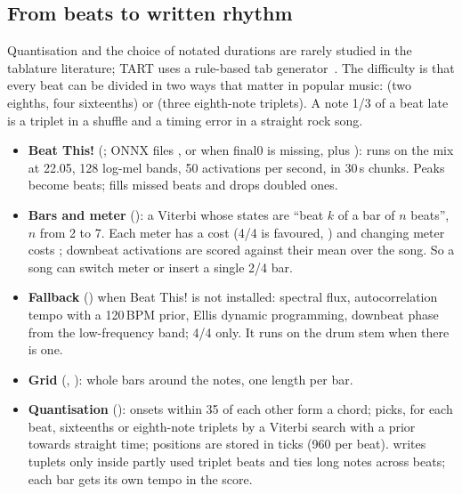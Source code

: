 \subsection{From beats to written rhythm}

Quantisation and the choice of notated durations are rarely studied in the
tablature literature; TART uses a rule-based tab generator~\cite{gupta2026tart}.
The difficulty is that every beat can be divided in two ways that matter in
popular music:  (two eighths, four sixteenths) or
 (three eighth-note triplets). A note 1/3 of a beat late is a
triplet in a shuffle and a timing error in a straight rock song.

\begin{inapp}
\begin{itemize}
\item \textbf{Beat This!} (; ONNX files
  , or  when final0 is
  missing, plus ): runs on the mix at 22.05\kHz{},
  128 log-mel bands, 50 activations per second, in 30\,s chunks. Peaks become
  beats;  fills missed beats and drops doubled ones.
\item \textbf{Bars and meter} (): a
   Viterbi whose states are ``beat $k$ of a bar of $n$
  beats'', $n$ from 2 to 7. Each meter has a cost (4/4 is favoured,
  ) and changing meter costs ; downbeat
  activations are scored against their mean over the song. So a song can switch
  meter or insert a single 2/4 bar.
\item \textbf{Fallback} () when Beat This! is not
  installed: spectral flux, autocorrelation tempo with a 120\,BPM prior, Ellis
  dynamic programming, downbeat phase from the low-frequency band; 4/4 only. It
  runs on the drum stem when there is one.
\item \textbf{Grid} (, ): whole bars
  around the notes, one length per bar.
\item \textbf{Quantisation} (): onsets within 35\ms{}
  of each other form a chord;  picks, for each beat,
  sixteenths or eighth-note triplets by a Viterbi search with a prior towards
  straight time; positions are stored in ticks (960 per beat). 
  writes tuplets only inside partly used triplet beats and ties long notes
  across beats; each bar gets its own tempo in the score.
\end{itemize}
\end{inapp}


